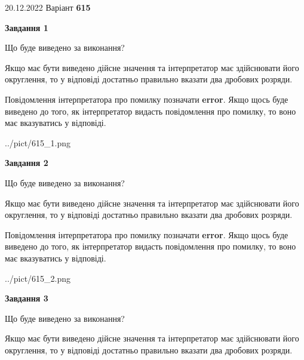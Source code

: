 \documentclass[12pt, ukrainian]{article}
\begin{document}
{20.12.2022 Варіант \No \textbf { 615 }\par}
{
\begin {Large}

{\begin {center}\textbf{Завдання 1}\end {center}}\par
Що буде виведено за виконання? \par

Якщо має бути виведено дійсне значення та інтерпретатор має здійснювати його округлення, 
то у відповіді достатньо правильно вказати два дробових розряди.

Повідомлення інтерпретатора про помилку позначати \textbf{error}.
Якщо щось буде виведено до того, як інтерпретатор видасть повідомлення про помилку, 
то воно має вказуватись у відповіді. \par

\begin{center}
	{../pict/615_1.png}
\end{center}
\newpage

{\begin {center}\textbf{Завдання 2}\end {center}}\par
Що буде виведено за виконання? \par

Якщо має бути виведено дійсне значення та інтерпретатор має здійснювати його округлення, 
то у відповіді достатньо правильно вказати два дробових розряди.

Повідомлення інтерпретатора про помилку позначати \textbf{error}.
Якщо щось буде виведено до того, як інтерпретатор видасть повідомлення про помилку, 
то воно має вказуватись у відповіді. \par

\begin{center}
	{../pict/615_2.png}
\end{center}
\newpage

{\begin {center}\textbf{Завдання 3}\end {center}}\par
Що буде виведено за виконання? \par

Якщо має бути виведено дійсне значення та інтерпретатор має здійснювати його округлення, 
то у відповіді достатньо правильно вказати два дробових розряди.


\end{Large}}
\end{document}

